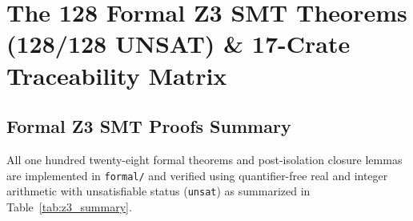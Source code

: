 \documentclass[11pt,onecolumn]{article}
\begin{document}
\FloatBarrier

\section{The 128 Formal Z3 SMT Theorems (128/128 UNSAT) \& 17-Crate Traceability Matrix}
\label{sec:smt_theorems_94}

\subsection{Formal Z3 SMT Proofs Summary}
All one hundred twenty-eight formal theorems and post-isolation closure lemmas are implemented in \texttt{formal/} and verified using quantifier-free real and integer arithmetic with unsatisfiable status (\texttt{unsat}) as summarized in Table~\ref{tab:z3_summary}.
\end{document}
